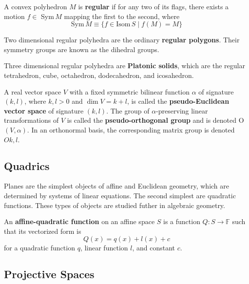 \documentclass{article}
\begin{document}
    \begin{definition}
      A convex polyhedron $M$ is \textbf{regular} if for any two of its flags, there exists a motion $f \in$ Sym$\,M$ mapping the first to the second, where 
      \begin{equation}
        \text{Sym}\,M \equiv \{f \in \text{Isom}\,S \;|\; f(M) = M \}
      \end{equation}
    \end{definition}

    Two dimensional regular polyhedra are the ordinary \textbf{regular polygons}. Their symmetry groups are known as the dihedral groups.

    Three dimensional regular polyhedra are \textbf{Platonic solids}, which are the regular tetrahedron, cube, octahedron, dodecahedron, and icosahedron. 

    \begin{definition}
      A real vector space $V$ with a fixed symmetric bilinear function $\alpha$ of signature $(k, l)$, where $k, l > 0$ and $\dim{V} = k+l$, is called the \textbf{pseudo-Euclidean vector space} of signature $(k, l)$. The group of $\alpha$-preserving linear transformations of $V$ is called the \textbf{pseudo-orthogonal group} and is denoted O$(V, \alpha)$. In an orthonormal basis, the corresponding matrix group is denoted $O{k,l}$. 
    \end{definition}

  \subsection{Quadrics}

    Planes are the simplest objects of affine and Euclidean geometry, which are determined by systems of linear equations. The second simplest are quadratic functions. These types of objects are studied futher in algebraic geometry. 

    \begin{definition}
      An \textbf{affine-quadratic function} on an affine space $S$ is a function $Q: S \longrightarrow \mathbb{F}$ such that its vectorized form is
      \begin{equation}
        Q(x) = q(x) + l(x) + c
      \end{equation}
      for a quadratic function $q$, linear function $l$, and constant $c$. 
    \end{definition}

  \subsection{Projective Spaces}
\end{document}
